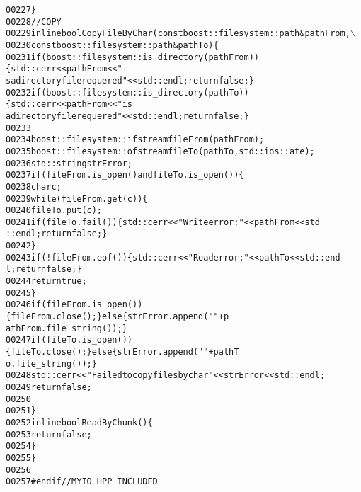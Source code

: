 \begin{footnotesize}
\begin{alltt}
00227     \}
00228     \textcolor{comment}{//COPY}
00229     \textcolor{keyword}{inline} \textcolor{keywordtype}{bool} CopyFileByChar(\textcolor{keyword}{const} boost::filesystem::path &pathFrom,\(\backslash\)
00230                                \textcolor{keyword}{const} boost::filesystem::path &pathTo)\{
00231         \textcolor{keywordflow}{if} ( boost::filesystem::is\_directory(pathFrom) )\{std::cerr<<pathFrom<<\textcolor{stringliteral}{" i
      s a directory file requered"}<<std::endl; \textcolor{keywordflow}{return} \textcolor{keyword}{false}; \}
00232         \textcolor{keywordflow}{if} ( boost::filesystem::is\_directory(pathTo) )\{ std::cerr<<pathFrom<<\textcolor{stringliteral}{" is
       a directory file requered"}<<std::endl; \textcolor{keywordflow}{return} \textcolor{keyword}{false}; \}
00233 
00234         boost::filesystem::ifstream fileFrom (pathFrom);
00235         boost::filesystem::ofstream fileTo (pathTo,std::ios::ate);
00236         std::string strError;
00237         \textcolor{keywordflow}{if} (fileFrom.is\_open() and fileTo.is\_open())\{
00238             \textcolor{keywordtype}{char} c;
00239             \textcolor{keywordflow}{while} (fileFrom.get(c))\{
00240                 fileTo.put(c);
00241                 \textcolor{keywordflow}{if} ( fileTo.fail() ) \{ std::cerr << \textcolor{stringliteral}{"Write error:"}<<pathFrom<<std
      ::endl; \textcolor{keywordflow}{return} \textcolor{keyword}{false}; \}
00242             \}
00243             \textcolor{keywordflow}{if} ( !fileFrom.eof() ) \{ std::cerr << \textcolor{stringliteral}{"Read error:"}<<pathTo<<std::end
      l; \textcolor{keywordflow}{return} \textcolor{keyword}{false}; \}
00244             \textcolor{keywordflow}{return} \textcolor{keyword}{true};
00245         \}
00246         \textcolor{keywordflow}{if} (fileFrom.is\_open())\{ fileFrom.close(); \} \textcolor{keywordflow}{else} \{ strError.append(\textcolor{stringliteral}{" "}+p
      athFrom.file\_string()); \}
00247         \textcolor{keywordflow}{if} (fileTo.is\_open())\{ fileTo.close(); \} \textcolor{keywordflow}{else} \{ strError.append(\textcolor{stringliteral}{" "}+pathT
      o.file\_string()); \}
00248         std::cerr<<\textcolor{stringliteral}{"Failed to copy files by char"}<<strError<<std::endl;
00249         \textcolor{keywordflow}{return} \textcolor{keyword}{false};
00250 
00251     \}
00252     \textcolor{keyword}{inline} \textcolor{keywordtype}{bool} ReadByChunk()\{
00253         \textcolor{keywordflow}{return} \textcolor{keyword}{false};
00254     \}
00255 \}
00256 
00257 \textcolor{preprocessor}{#endif // MYIO\_HPP\_INCLUDED}
\end{alltt}\end{footnotesize}
